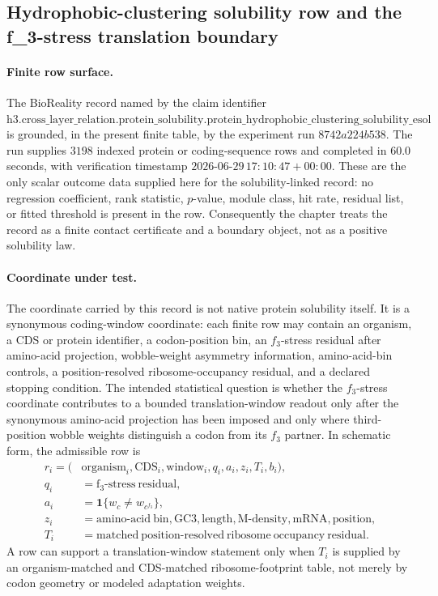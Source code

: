 
\subsection{Hydrophobic-clustering solubility row and the f\_3-stress translation boundary}
\label{sec:bioreality-hydrophobic-clustering-solubility-esol-f3-boundary}

\paragraph{Finite row surface.}
The BioReality record named by the claim identifier
$\mathrm{h3.cross\_layer\_relation.protein\_solubility.protein\_hydrophobic\_clustering\_solubility\_esol}$ is grounded, in the present finite table, by the experiment run $8742a224b538$.  The run supplies $3198$ indexed protein or coding-sequence rows and completed in $60.0$ seconds, with verification timestamp $2026\text{-}06\text{-}29\,17{:}10{:}47+00{:}00$.  These are the only scalar outcome data supplied here for the solubility-linked record: no regression coefficient, rank statistic, $p$-value, module class, hit rate, residual list, or fitted threshold is present in the row.  Consequently the chapter treats the record as a finite contact certificate and a boundary object, not as a positive solubility law.

\paragraph{Coordinate under test.}
The coordinate carried by this record is not native protein solubility itself.  It is a synonymous coding-window coordinate: each finite row may contain an organism, a CDS or protein identifier, a codon-position bin, an $f_3$-stress residual after amino-acid projection, wobble-weight asymmetry information, amino-acid-bin controls, a position-resolved ribosome-occupancy residual, and a declared stopping condition.  The intended statistical question is whether the $f_3$-stress coordinate contributes to a bounded translation-window readout only after the synonymous amino-acid projection has been imposed and only where third-position wobble weights distinguish a codon from its $f_3$ partner.  In schematic form, the admissible row is
$$
\begin{aligned}
 r_i = (&\mathrm{organism}_i,\mathrm{CDS}_i,\mathrm{window}_i, q_i, a_i, z_i, T_i, b_i),\\
 q_i &= \mathrm{f_3\text{-}stress\ residual},\\
 a_i &= \mathbf{1}\{w_c \neq w_{c^{f_3}}\},\\
 z_i &= \mathrm{amino\text{-}acid\ bin,GC3,length,M\text{-}density,mRNA,position},\\
 T_i &= \mathrm{matched\ position\text{-}resolved\ ribosome\ occupancy\ residual}.
\end{aligned}
$$
A row can support a translation-window statement only when $T_i$ is supplied by an organism-matched and CDS-matched ribosome-footprint table, not merely by codon geometry or modeled adaptation weights.

